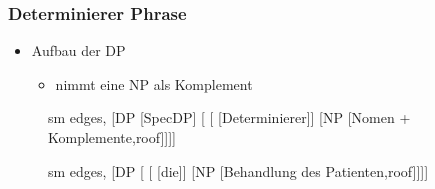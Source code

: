 \begin{frame}
\frametitle{Determinierer Phrase}

	\begin{itemize}
		\item Aufbau der DP
		\begin{itemize}
			\item {} nimmt eine NP als Komplement
		\end{itemize}
	\end{itemize}


\begin{figure}[b]
  	\begin{minipage}[b]{0.45\textwidth}
	\centering
	\footnotesize{
		\begin{forest}
		sm edges,
		[DP [SpecDP]
			[ 	[ [Determinierer]]
						[NP [Nomen + Komplemente,roof]]]]
		\end{forest}
		}
  	\end{minipage}  
	\begin{minipage}[b]{0.45\textwidth}
	\centering
	\footnotesize{
		\begin{forest}
		sm edges,
		[DP [ 	[ [die]]
						[NP [Behandlung des Patienten,roof]]]]
		\end{forest}
		}
  	\end{minipage}  
\end{figure}

\end{frame}


